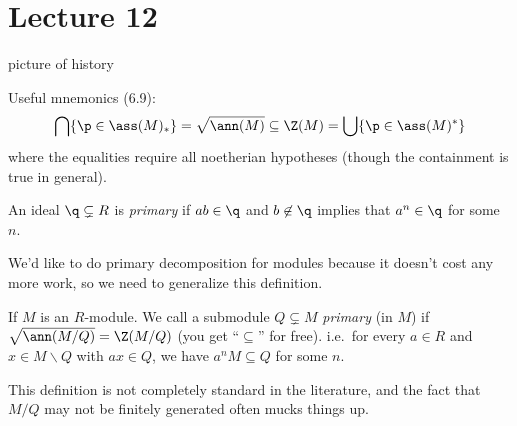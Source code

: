  \section{Lecture 12}

 picture of history

 Useful mnemonics (6.9):
 \[
  \bigcap \{\p\in \ass (M)_*\} = \sqrt{\ann (M)} \subseteq   \Z(M) =
  \bigcup \{\p\in \ass (M)^*\}
 \]
 where the equalities require all noetherian hypotheses (though the containment is true
 in general).
 \begin{definition}[Lasker, 1905]
   An ideal $\q\subsetneq R$ is \emph{primary} if $ab\in \q$ and $b\not\in \q$ implies
   that $a^n\in \q$ for some $n$.
 \end{definition}
 We'd like to do primary decomposition for modules because it doesn't cost any more work,
 so we need to generalize this definition.
 \begin{definition}
   If $M$ is an $R$-module. We call a submodule $Q\subsetneq M$ \emph{primary} (in $M$) if
   $\sqrt{\ann (M/Q)}= \Z(M/Q)$ (you get ``$\subseteq$'' for free). i.e.\ for every $a\in
   R$ and $x\in M\smallsetminus Q$ with $ax\in Q$, we have $a^n M\subseteq Q$ for some
   $n$.
 \end{definition}
 \begin{warning}
   This definition is not completely standard in the literature, and the fact that $M/Q$
   may not be finitely generated often mucks things up.
 \end{warning}

